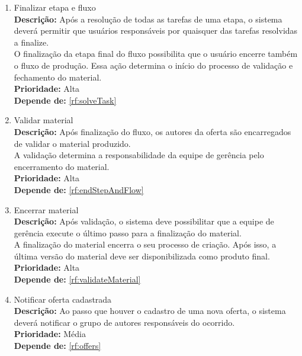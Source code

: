 \begin{enumerate}[label=\textbf{RF\protect\twodigits{\theenumi}}, leftmargin=2cm]
	\item \label{rf:endStepAndFlow} Finalizar etapa e fluxo \\ 
		\textbf{Descrição:} Após a resolução de todas as tarefas de uma etapa, o sistema deverá permitir que usuários responsáveis por quaisquer das tarefas resolvidas a finalize. \\
		O finalização da etapa final do fluxo possibilita que o usuário encerre também o fluxo de produção. Essa ação determina o início do processo de validação e fechamento do material. \\
		\textbf{Prioridade:} Alta \\
		\textbf{Depende de:} \hyperref[rf:solveTask]{\ref{rf:solveTask}}

	\item \label{rf:validateMaterial} Validar material \\ 
		\textbf{Descrição:} Após finalização do fluxo, os autores da oferta são encarregados de validar o material produzido. \\
		A validação determina a responsabilidade da equipe de gerência pelo encerramento do material. \\
		\textbf{Prioridade:} Alta \\
		\textbf{Depende de:} \hyperref[rf:endStepAndFlow]{\ref{rf:endStepAndFlow}}

	\item \label{rf:completeMaterial} Encerrar material \\ 
		\textbf{Descrição:} Após validação, o sistema deve possibilitar que a equipe de gerência execute o último passo para a finalização do material. \\
		A finalização do material encerra o seu processo de criação. Após isso, a última versão do material deve ser disponibilizada como produto final. \\
		\textbf{Prioridade:} Alta \\
		\textbf{Depende de:} \hyperref[rf:validateMaterial]{\ref{rf:validateMaterial}}

	\item \label{rf:newOfferNotification} Notificar oferta cadastrada \\ 
		\textbf{Descrição:} Ao passo que houver o cadastro de uma nova oferta, o sistema deverá notificar o grupo de autores responsáveis do ocorrido. \\
		\textbf{Prioridade:} Média \\
		\textbf{Depende de:} \hyperref[rf:offers]{\ref{rf:offers}}


\end{enumerate}
